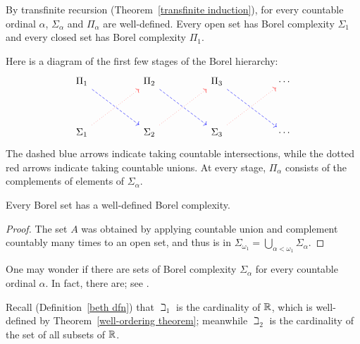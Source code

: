 \begin{subsec}
By transfinite recursion (Theorem~\ref{transfinite induction}), for every countable ordinal $\alpha$, $\Sigma_{\alpha}$ and $\Pi_{\alpha}$ are well-defined.
Every open set has Borel complexity $\Sigma_{1}$ and every closed set has Borel complexity $\Pi_{1}$.
\end{subsec}

\begin{subsec}
Here is a diagram of the first few stages of the Borel hierarchy:
$$\begin{tikzcd}
\Pi_{1} \arrow[drdr,dashed,blue] && \Pi_{2} \arrow[drdr,dashed,blue] && \Pi_{3} \arrow[drdr,dashed,blue] && \cdots\\\\
\Sigma_{1} \arrow[urur,dotted,red] && \Sigma_{2} \arrow[urur,dotted,red] && \Sigma_{3} \arrow[urur,dotted,red] && \cdots
\end{tikzcd}$$
The dashed blue arrows indicate taking countable intersections, while the dotted red arrows indicate taking countable unions.
At every stage, $\Pi_{\alpha}$ consists of the complements of elements of $\Sigma_{\alpha}$.
\end{subsec}

\begin{lemma}
Every Borel set has a well-defined Borel complexity.
\end{lemma}
\begin{proof}
The set $A$ was obtained by applying countable union and complement countably many times to an open set, and thus is in $\Sigma_{\omega_{1}} = \bigcup_{\alpha < \omega_{1}} \Sigma_{\alpha}$.
\end{proof}

\begin{subsec}
One may wonder if there are sets of Borel complexity $\Sigma_{\alpha}$ for every countable ordinal $\alpha$. In fact, there are; see \cite[Corollary 2.38]{Marker2002}.
\end{subsec}

\begin{subsec}
Recall (Definition~\ref{beth dfn}) that $\beth_{1}$ is the cardinality of $\mathbb{R}$, which is well-defined by Theorem~\ref{well-ordering theorem}; meanwhile $\beth_{2}$ is the cardinality of the set of all subsets of $\mathbb{R}$.
\end{subsec}

